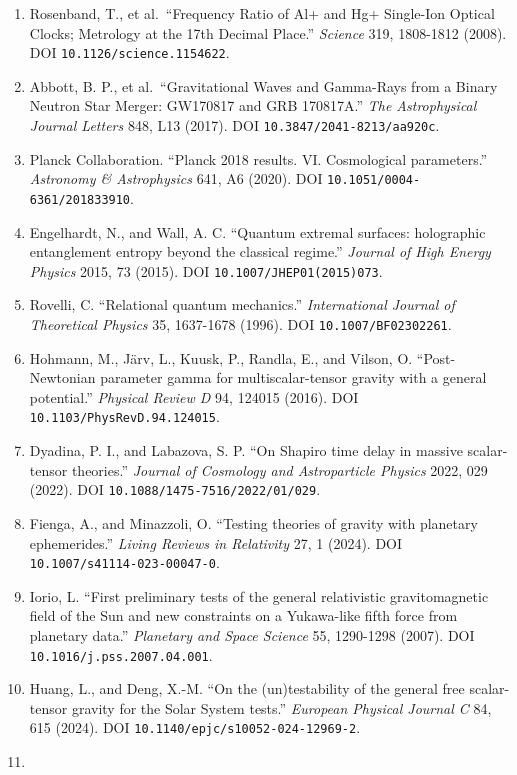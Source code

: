 \documentclass[
  american,
  11pt,
  letterpaper,
]{article}
\begin{document}
\begin{enumerate}
\item
  Rosenband, T., et al.~``Frequency Ratio of Al+ and Hg+ Single-Ion Optical Clocks; Metrology at the 17th Decimal Place.'' \emph{Science} 319, 1808-1812 (2008). DOI \nolinkurl{10.1126/science.1154622}.
\item
  Abbott, B. P., et al.~``Gravitational Waves and Gamma-Rays from a Binary Neutron Star Merger: GW170817 and GRB 170817A.'' \emph{The Astrophysical Journal Letters} 848, L13 (2017). DOI \nolinkurl{10.3847/2041-8213/aa920c}.
\item
  Planck Collaboration. ``Planck 2018 results. VI. Cosmological parameters.'' \emph{Astronomy \& Astrophysics} 641, A6 (2020). DOI \nolinkurl{10.1051/0004-6361/201833910}.
\item
  Engelhardt, N., and Wall, A. C. ``Quantum extremal surfaces: holographic entanglement entropy beyond the classical regime.'' \emph{Journal of High Energy Physics} 2015, 73 (2015). DOI \nolinkurl{10.1007/JHEP01(2015)073}.
\item
  Rovelli, C. ``Relational quantum mechanics.'' \emph{International Journal of Theoretical Physics} 35, 1637-1678 (1996). DOI \nolinkurl{10.1007/BF02302261}.
\item
  Hohmann, M., Järv, L., Kuusk, P., Randla, E., and Vilson, O. ``Post-Newtonian parameter gamma for multiscalar-tensor gravity with a general potential.'' \emph{Physical Review D} 94, 124015 (2016). DOI \nolinkurl{10.1103/PhysRevD.94.124015}.
\item
  Dyadina, P. I., and Labazova, S. P. ``On Shapiro time delay in massive scalar-tensor theories.'' \emph{Journal of Cosmology and Astroparticle Physics} 2022, 029 (2022). DOI \nolinkurl{10.1088/1475-7516/2022/01/029}.
\item
  Fienga, A., and Minazzoli, O. ``Testing theories of gravity with planetary ephemerides.'' \emph{Living Reviews in Relativity} 27, 1 (2024). DOI \nolinkurl{10.1007/s41114-023-00047-0}.
\item
  Iorio, L. ``First preliminary tests of the general relativistic gravitomagnetic field of the Sun and new constraints on a Yukawa-like fifth force from planetary data.'' \emph{Planetary and Space Science} 55, 1290-1298 (2007). DOI \nolinkurl{10.1016/j.pss.2007.04.001}.
\item
  Huang, L., and Deng, X.-M. ``On the (un)testability of the general free scalar-tensor gravity for the Solar System tests.'' \emph{European Physical Journal C} 84, 615 (2024). DOI \nolinkurl{10.1140/epjc/s10052-024-12969-2}.
\item

\end{enumerate}
\end{document}

